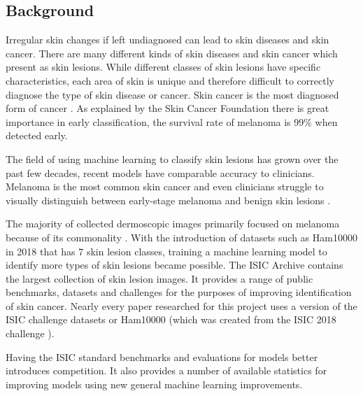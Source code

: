\documentclass[12pt,nonacm,acmlarge,titlepage,screen]{acmart}
\begin{document}
	\subsection{Background} \label{sec:background}
	Irregular skin changes if left undiagnosed can lead to skin diseases and skin cancer. There are many different kinds of skin diseases and skin cancer which present as skin lesions. While different classes of skin lesions have specific characteristics, each area of skin is unique and therefore difficult to correctly diagnose the type of skin disease or cancer. Skin cancer is the most diagnosed form of cancer \cite{skin_cancer_foundation}. As explained by the Skin Cancer Foundation \cite{skin_cancer_foundation} there is great importance in early classification, the survival rate of melanoma is 99\% when detected early.

	\medskip\noindent
	The field of using machine learning to classify skin lesions has grown over the past few decades, recent models have comparable accuracy to clinicians. Melanoma is the most common skin cancer and even clinicians struggle to visually distinguish between early-stage melanoma and benign skin lesions \cite{isic_site_mission}.
	
	\medskip\noindent
	The majority of collected dermoscopic images primarily focused on melanoma because of its commonality \cite{isic_site_mission}. With the introduction of datasets such as Ham10000 \cite{ham_paper} in 2018 that has 7 skin lesion classes, training a machine learning model to identify more types of skin lesions became possible. The ISIC Archive \cite{isic_site} contains the largest collection of skin lesion images. It provides a range of public benchmarks, datasets and challenges for the purposes of improving identification of skin cancer. Nearly every paper researched for this project uses a version of the ISIC challenge datasets or Ham10000 (which was created from the ISIC 2018 challenge \cite{isic_2018_challenge}).

	\medskip\noindent
	Having the ISIC standard benchmarks and evaluations for models better introduces competition. It also provides a number of available statistics for improving models using new general machine learning improvements.
\end{document}
